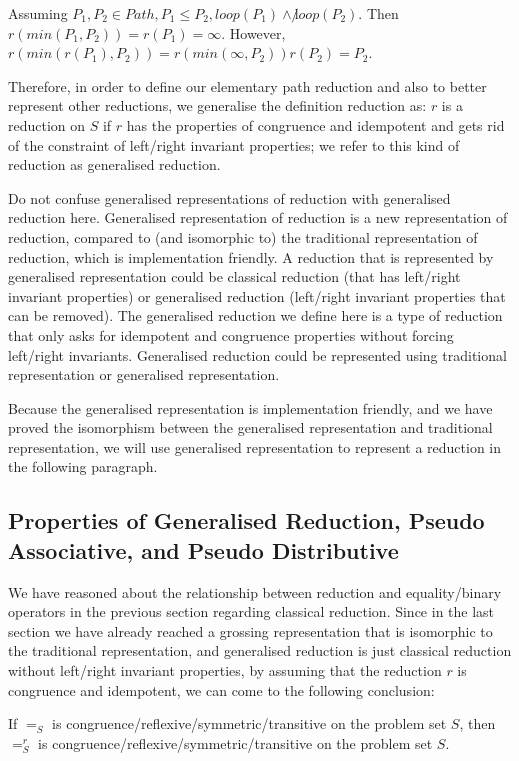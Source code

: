 \documentclass[a4paper,12pt,twoside,openright]{report}
\begin{document}
Assuming $P_1,P_2 \in Path, P_1 \leq P_2, loop(P_1) \wedge \not loop(P_2)$. 
Then $r(min(P_1,P_2)) = r(P_1) = \infty$.
However, $r(min(r(P_1),P_2)) = r(min(\infty,P_2)) r(P_2) = P_2$. 

Therefore, in order to define our elementary path reduction and also to better represent other reductions, we generalise the definition reduction as: $r$ is a reduction on $S$ if $r$ has the properties of congruence and idempotent and gets rid of the constraint of left/right invariant properties; we refer to this kind of reduction as generalised reduction.

Do not confuse generalised representations of reduction with generalised reduction here. 
Generalised representation of reduction is a new representation of reduction, compared to (and isomorphic to) the traditional representation of reduction, which is implementation friendly.  A reduction that is represented by generalised representation could be classical reduction (that has left/right invariant properties) or generalised reduction (left/right invariant properties that can be removed).
The generalised reduction we define here is a type of reduction that only asks for idempotent and congruence properties without forcing left/right invariants.  Generalised reduction could be represented using traditional representation or generalised representation.

Because the generalised representation is implementation friendly, and we have proved the isomorphism between the generalised representation and traditional representation, we will use generalised representation to represent a reduction in the following paragraph.

\subsection{Properties of Generalised Reduction, Pseudo Associative, and Pseudo Distributive}
We have reasoned about the relationship between reduction and equality/binary operators in the previous section regarding classical reduction. 
Since in the last section we have already reached a grossing representation that is isomorphic to the traditional representation, and generalised reduction is just classical reduction without left/right invariant properties, by assuming that the reduction $r$ is congruence and idempotent, we can come to the following conclusion:

If $=_S$ is congruence/reflexive/symmetric/transitive on the problem set $S$, then $=^r_S$ is congruence/reflexive/symmetric/transitive on the problem set $S$.
\end{document}
